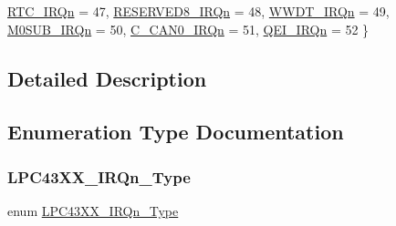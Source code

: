 \begin{DoxyCompactItemize}
\hyperlink{group___c_m_s_i_s__43_x_x___i_r_q_gga2018a6433701e9ee9b34797425127919adcc0f2770f7f57f75fac3d8bcac0e858}{R\+T\+C\+\_\+\+I\+R\+Qn} = 47, 
\hyperlink{group___c_m_s_i_s__43_x_x___i_r_q_gga2018a6433701e9ee9b34797425127919a951c51ca47441c1892972ba4c57f5b35}{R\+E\+S\+E\+R\+V\+E\+D8\+\_\+\+I\+R\+Qn} = 48, 
\hyperlink{group___c_m_s_i_s__43_x_x___i_r_q_gga2018a6433701e9ee9b34797425127919a87a86cbd9c4a352c290aaf6f492bcce5}{W\+W\+D\+T\+\_\+\+I\+R\+Qn} = 49, 
\newline
\hyperlink{group___c_m_s_i_s__43_x_x___i_r_q_gga2018a6433701e9ee9b34797425127919aaddccebfeb4fd5f2f53196ee0d04d843}{M0\+S\+U\+B\+\_\+\+I\+R\+Qn} = 50, 
\hyperlink{group___c_m_s_i_s__43_x_x___i_r_q_gga2018a6433701e9ee9b34797425127919a646fe1670a0623976ee89d8ee2ffcd76}{C\+\_\+\+C\+A\+N0\+\_\+\+I\+R\+Qn} = 51, 
\hyperlink{group___c_m_s_i_s__43_x_x___i_r_q_gga2018a6433701e9ee9b34797425127919a82471ba65527ad3f3da8af38acb953bf}{Q\+E\+I\+\_\+\+I\+R\+Qn} = 52
 \}
\end{DoxyCompactItemize}


\subsection{Detailed Description}


\subsection{Enumeration Type Documentation}
\mbox{\label{group___c_m_s_i_s__43_x_x___i_r_q_ga2018a6433701e9ee9b34797425127919}} 
\subsubsection{\texorpdfstring{L\+P\+C43\+X\+X\+\_\+\+I\+R\+Qn\+\_\+\+Type}{LPC43XX\_IRQn\_Type}}
{\footnotesize\ttfamily enum \hyperlink{group___c_m_s_i_s__43_x_x___i_r_q_ga2018a6433701e9ee9b34797425127919}{L\+P\+C43\+X\+X\+\_\+\+I\+R\+Qn\+\_\+\+Type}}

